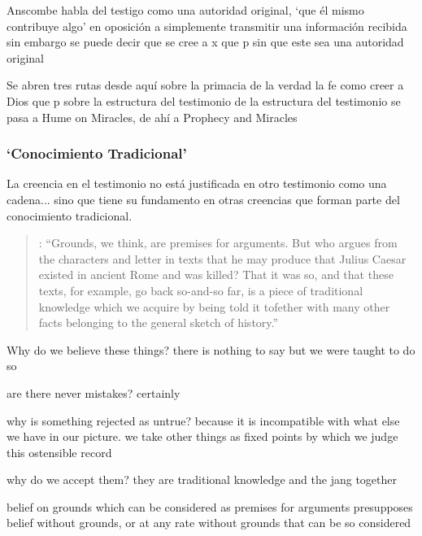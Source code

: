 Anscombe habla del testigo como una autoridad original, `que él mismo contribuye algo' en oposición a simplemente transmitir una información recibida sin embargo se puede decir que se cree a x que p sin que este sea una autoridad original

Se abren tres rutas desde aquí sobre la primacia de la verdad la fe como creer a Dios que p sobre la estructura del testimonio de la estructura del testimonio se pasa a Hume on Miracles, de ahí a Prophecy and Miracles

\subsubsection{`Conocimiento Tradicional'}

La creencia en el testimonio no está justificada en otro testimonio como una cadena... sino que tiene su fundamento en otras creencias que forman parte del conocimiento tradicional.

\blockquote[{\cite[121--122]{anscombe2015logic:grounds}}: \enquote{Grounds, we think, are premises for arguments. But who argues from the characters and letter in texts that he may produce that Julius Caesar existed in ancient Rome and was killed? That it was so, and that these texts, for example, go back so-and-so far, is a piece of traditional knowledge which we acquire by being told it tofether with many other facts belonging to the general sketch of history.}]{}

Why do we believe these things? there is nothing to say but we were taught to do so

are there never mistakes? certainly

why is something rejected as untrue? because it is incompatible with what else we have in our picture. we take other things as fixed points by which we judge this ostensible record

why do we accept them? they are traditional knowledge and the jang together

belief on grounds which can be considered as premises for arguments presupposes belief without grounds, or at any rate without grounds that can be so considered



